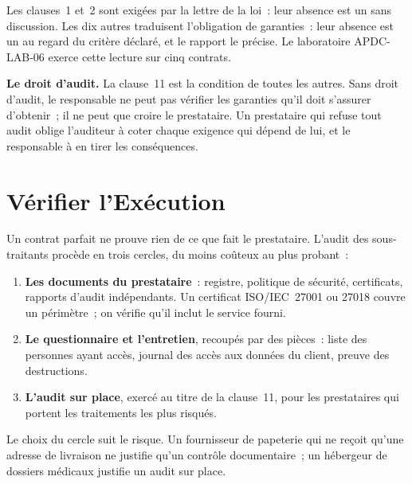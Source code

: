Les clauses~1 et~2 sont exigées par la lettre de la loi~: leur absence est
un \NON{} sans discussion. Les dix autres traduisent l'obligation de
garanties~: leur absence est un \NON{} au regard du critère déclaré, et le
rapport le précise. Le laboratoire APDC-LAB-06 exerce cette lecture sur
cinq contrats.

\begin{boxinfo}
\textbf{Le droit d'audit.} La clause~11 est la condition de toutes les
autres. Sans droit d'audit, le responsable ne peut pas vérifier les
garanties qu'il doit s'assurer d'obtenir~; il ne peut que croire le
prestataire. Un prestataire qui refuse tout audit oblige l'auditeur à
coter \NEK{} chaque exigence qui dépend de lui, et le responsable à en
tirer les conséquences.
\end{boxinfo}

\section{Vérifier l'Exécution}
\label{sec:c10-execution}

Un contrat parfait ne prouve rien de ce que fait le prestataire. L'audit des
sous-traitants procède en trois cercles, du moins coûteux au plus probant~:

\begin{enumerate}
    \item \textbf{Les documents du prestataire}~: registre, politique de
          sécurité, certificats, rapports d'audit indépendants. Un
          certificat ISO/IEC~27001 ou 27018 couvre un périmètre~; on vérifie
          qu'il inclut le service fourni.
    \item \textbf{Le questionnaire et l'entretien}, recoupés par des pièces~:
          liste des personnes ayant accès, journal des accès aux données du
          client, preuve des destructions.
    \item \textbf{L'audit sur place}, exercé au titre de la clause~11, pour
          les prestataires qui portent les traitements les plus risqués.
\end{enumerate}

Le choix du cercle suit le risque. Un fournisseur de papeterie qui ne
reçoit qu'une adresse de livraison ne justifie qu'un contrôle documentaire~;
un hébergeur de dossiers médicaux justifie un audit sur place.

